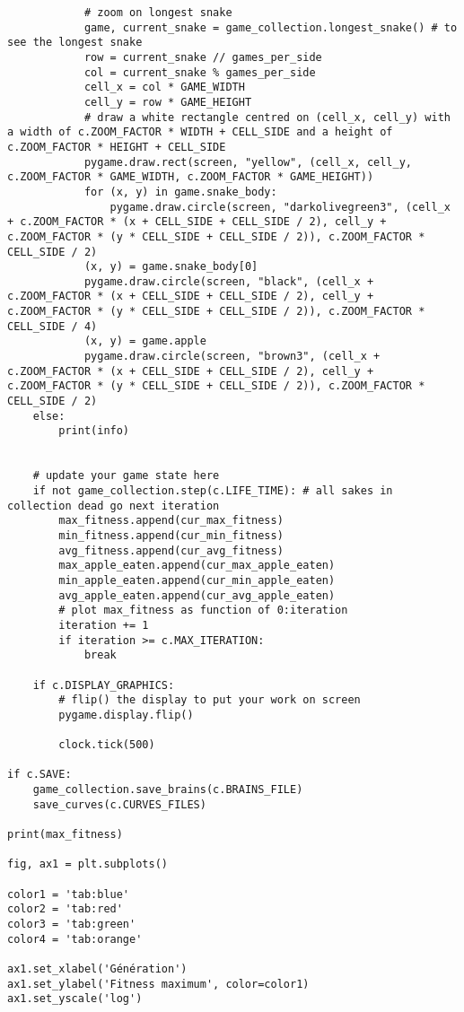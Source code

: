 \documentclass[11pt,a4paper]{article}
\begin{document}
\begin{verbatim}
            # zoom on longest snake
            game, current_snake = game_collection.longest_snake() # to see the longest snake
            row = current_snake // games_per_side
            col = current_snake % games_per_side
            cell_x = col * GAME_WIDTH
            cell_y = row * GAME_HEIGHT
            # draw a white rectangle centred on (cell_x, cell_y) with a width of c.ZOOM_FACTOR * WIDTH + CELL_SIDE and a height of c.ZOOM_FACTOR * HEIGHT + CELL_SIDE
            pygame.draw.rect(screen, "yellow", (cell_x, cell_y, c.ZOOM_FACTOR * GAME_WIDTH, c.ZOOM_FACTOR * GAME_HEIGHT))
            for (x, y) in game.snake_body:
                pygame.draw.circle(screen, "darkolivegreen3", (cell_x + c.ZOOM_FACTOR * (x + CELL_SIDE + CELL_SIDE / 2), cell_y + c.ZOOM_FACTOR * (y * CELL_SIDE + CELL_SIDE / 2)), c.ZOOM_FACTOR * CELL_SIDE / 2)
            (x, y) = game.snake_body[0]
            pygame.draw.circle(screen, "black", (cell_x + c.ZOOM_FACTOR * (x + CELL_SIDE + CELL_SIDE / 2), cell_y + c.ZOOM_FACTOR * (y * CELL_SIDE + CELL_SIDE / 2)), c.ZOOM_FACTOR * CELL_SIDE / 4)
            (x, y) = game.apple
            pygame.draw.circle(screen, "brown3", (cell_x + c.ZOOM_FACTOR * (x + CELL_SIDE + CELL_SIDE / 2), cell_y + c.ZOOM_FACTOR * (y * CELL_SIDE + CELL_SIDE / 2)), c.ZOOM_FACTOR * CELL_SIDE / 2)
    else:
        print(info)


    # update your game state here
    if not game_collection.step(c.LIFE_TIME): # all sakes in collection dead go next iteration
        max_fitness.append(cur_max_fitness)
        min_fitness.append(cur_min_fitness)
        avg_fitness.append(cur_avg_fitness)
        max_apple_eaten.append(cur_max_apple_eaten)
        min_apple_eaten.append(cur_min_apple_eaten)
        avg_apple_eaten.append(cur_avg_apple_eaten)
        # plot max_fitness as function of 0:iteration
        iteration += 1
        if iteration >= c.MAX_ITERATION:
            break

    if c.DISPLAY_GRAPHICS:
        # flip() the display to put your work on screen
        pygame.display.flip()

        clock.tick(500)

if c.SAVE:
    game_collection.save_brains(c.BRAINS_FILE)
    save_curves(c.CURVES_FILES)

print(max_fitness)

fig, ax1 = plt.subplots()

color1 = 'tab:blue'
color2 = 'tab:red'
color3 = 'tab:green'
color4 = 'tab:orange'

ax1.set_xlabel('Génération')
ax1.set_ylabel('Fitness maximum', color=color1)
ax1.set_yscale('log')


\end{verbatim}
\end{document}

